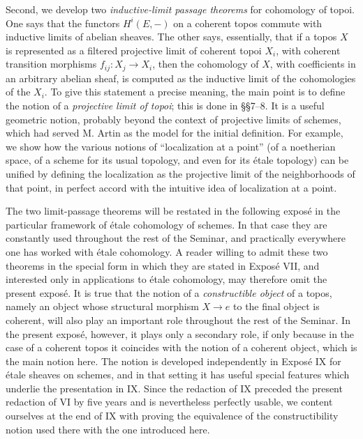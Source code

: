 \documentclass[11pt]{article}
\begin{document}
Second, we develop two \emph{inductive-limit passage theorems} for cohomology of topoi. One says that the functors \(H^i(E,-)\) on a coherent topos commute with inductive limits of abelian sheaves. The other says, essentially, that if a topos \(X\) is represented as a filtered projective limit of coherent topoi \(X_i\), with coherent transition morphisms \(f_{ij}:X_j\to X_i\), then the cohomology of \(X\), with coefficients in an arbitrary abelian sheaf, is computed as the inductive limit of the cohomologies of the \(X_i\). To give this statement a precise meaning, the main point is to define the notion of a \emph{projective limit of topoi}; this is done in \S\S7--8. It is a useful geometric notion, probably beyond the context of projective limits of schemes, which had served M. Artin as the model for the initial definition. For example, we show how the various notions of ``localization at a point'' (of a noetherian space, of a scheme for its usual topology, and even for its \'etale topology) can be unified by defining the localization as the projective limit of the neighborhoods of that point, in perfect accord with the intuitive idea of localization at a point.

The two limit-passage theorems will be restated in the following expos\'e in the particular framework of \'etale cohomology of schemes. In that case they are constantly used throughout the rest of the Seminar, and practically everywhere one has worked with \'etale cohomology. A reader willing to admit these two theorems in the special form in which they are stated in Expos\'e VII, and interested only in applications to \'etale cohomology, may therefore omit the present expos\'e. It is true that the notion of a \emph{constructible object} of a topos, namely an object whose structural morphism \(X\to e\) to the final object is coherent, will also play an important role throughout the rest of the Seminar. In the present expos\'e, however, it plays only a secondary role, if only because in the case of a coherent topos it coincides with the notion of a coherent object, which is the main notion here. The notion is developed independently in Expos\'e IX for \'etale sheaves on schemes, and in that setting it has useful special features which underlie the presentation in IX. Since the redaction of IX preceded the present redaction of VI by five years and is nevertheless perfectly usable, we content ourselves at the end of IX with proving the equivalence of the constructibility notion used there with the one introduced here.
\end{document}
